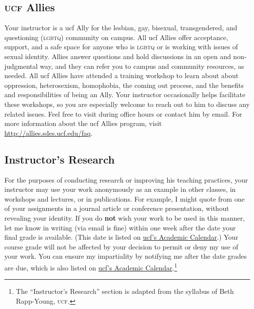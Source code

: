 \documentclass[11pt, twosides]{amsart}	%
\begin{document}
\subsection{\textsc{ucf} Allies} %
\label{sub:allies}
Your instructor is a \ac{ucf} Ally for the lesbian, gay, bisexual, transgendered, and questioning (\textsc{lgbtq}) community on campus. All \ac{ucf} Allies offer acceptance, support, and a safe space for anyone who is \textsc{lgbtq} or is working with issues of sexual identity. Allies answer questions and hold discussions in an open and non-judgmental way, and they can refer you to campus and community resources, as needed. All \ac{ucf} Allies have attended a training workshop to learn about about oppression, heterosexism, homophobia, the coming out process, and the benefits and responsibilities of being an Ally. Your instructor occasionally helps facilitate these workshops, so you are especially welcome to reach out to him to discuss any related issues. Feel free to visit during office hours or contact him by email. For more information about the \ac{ucf} Allies program, visit \href{http://allies.sdes.ucf.edu/faq}{http://allies.sdes.ucf.edu/faq}.

\subsection{Instructor's Research} %
\label{sub:instructor_s_research}
For the purposes of conducting research or improving his teaching practices, your instructor may use your work anonymously as an example in other classes, in workshops and lectures, or in publications. For example, I might quote from one of your assignments in a journal article or conference presentation, without revealing your identity. If you do \textbf{not} wish your work to be used in this manner, let me know in writing (via email is fine) within one week after the date your final grade is available. (This date is listed on \href{http://registrar.sdes.ucf.edu/calendar/academic/}{\ac{ucf}’s Academic Calendar}.) Your course grade will not be affected by your decision to permit or deny my use of your work. You can ensure my impartiality by notifying me after the date grades are due, which is also listed on \href{http://registrar.sdes.ucf.edu/calendar/academic/}{\ac{ucf}’s Academic Calendar}.\footnote{The ``Instructor's Research'' section is adapted from the syllabus of Beth Rapp-Young, \textsc{ucf}.}

\clearpage%
\end{document}
